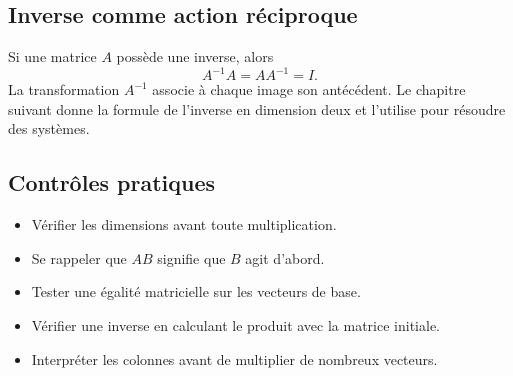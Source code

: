 \subsection{Inverse comme action réciproque}

Si une matrice $A$ possède une inverse, alors
\[
A^{-1}A=AA^{-1}=I.
\]
La transformation $A^{-1}$ associe à chaque image son antécédent. Le chapitre suivant donne la formule de l'inverse en dimension deux et l'utilise pour résoudre des systèmes.

\subsection{Contrôles pratiques}

\begin{itemize}
\item Vérifier les dimensions avant toute multiplication.
\item Se rappeler que $AB$ signifie que $B$ agit d'abord.
\item Tester une égalité matricielle sur les vecteurs de base.
\item Vérifier une inverse en calculant le produit avec la matrice initiale.
\item Interpréter les colonnes avant de multiplier de nombreux vecteurs.
\end{itemize}
